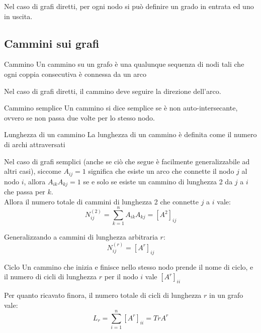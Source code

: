 Nel caso di grafi diretti, per ogni nodo si può definire un grado in entrata ed uno in uscita.

\subsection{Cammini sui grafi}
\begin{boxb}{Cammino}
Un cammino su un grafo è una qualunque sequenza di nodi tali che ogni coppia consecutiva è connessa da un arco
\end{boxb}
Nel caso di grafi diretti, il cammino deve seguire la direzione dell'arco.\\

\begin{boxb}{Cammino semplice}
Un cammino si dice semplice se è non auto-intersecante, ovvero se non passa due volte per lo stesso nodo.
\end{boxb}
\begin{boxb}{Lunghezza di un cammino}
La lunghezza di un cammino è definita come il numero di archi attraversati
\end{boxb}
Nel caso di grafi semplici (anche se ciò che segue è facilmente generalizzabile ad altri casi), siccome $A_{ij}=1$ significa che esiste un arco che connette il nodo $j$ al nodo $i$, allora $A_{ik}A_{kj}=1$ se e solo se esiste un cammino di lunghezza 2 da $j$ a $i$ che passa per $k$.\\

Allora il numero totale di cammini di lunghezza 2 che connette $j$ a $i$ vale:
\begin{equation}
  N^{(2)}_{ij}=\sum_{k=1}^{n}A_{ik}A_{kj}=\left[ A^2 \right]_{ij}
\end{equation}

Generalizzando a cammini di lunghezza arbitraria $r$:
\begin{equation}
  N^{(r)}_{ij}=\left[ A^r \right]_{ij}
\end{equation}

\begin{boxb}{Ciclo}
Un cammino che inizia e finisce nello stesso nodo prende il nome di ciclo, e il numero di cicli di lunghezza $r$ per il nodo $i$ vale $\left[ A^r \right]_{ii}$
\end{boxb}
Per quanto ricavato finora, il numero totale di cicli di lunghezza $r$ in un grafo vale:
\begin{equation}
  L_r=\sum_{i=1}^{n}\left[ A^r \right]_{ii}=Tr A^r
\end{equation}

